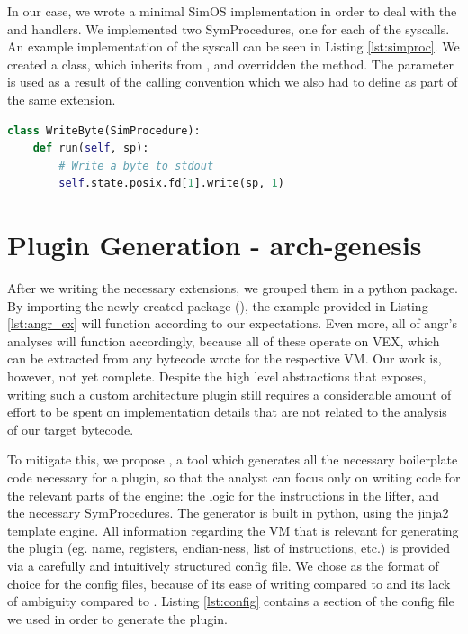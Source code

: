 In our case, we wrote a minimal SimOS implementation in order to deal with the  and  handlers. We implemented two SymProcedures, one for each of the \glspl{syscall}. An example implementation of the  \gls{syscall} can be seen in Listing \ref{lst:simproc}. We created a class, which inherits from , and overridden the  method. The parameter  is used as a result of the calling convention which we also had to define as part of the same extension.

\begin{lstlisting}[language=python, label={lst:simproc}, caption={TODO}]
class WriteByte(SimProcedure):
    def run(self, sp):
        # Write a byte to stdout
        self.state.posix.fd[1].write(sp, 1) 
\end{lstlisting}

\section{Plugin Generation - arch-genesis}

After we writing the necessary extensions, we grouped them in a python package. By importing the newly created package (), the example provided in Listing \ref{lst:angr_ex} will function according to our expectations. Even more, all of angr's analyses will function accordingly, because all of these operate on VEX, which can be extracted from any bytecode wrote for the respective \gls{VM}. Our work is, however, not yet complete. Despite the high level abstractions that  exposes, writing such a custom architecture plugin still requires a considerable amount of effort to be spent on implementation details that are not related to the analysis of our target bytecode.

To mitigate this, we propose , a tool which generates all the necessary boilerplate code necessary for a plugin, so that the analyst can focus only on writing code for the relevant parts of the engine: the logic for the instructions in the lifter, and the necessary SymProcedures. The generator is built in python, using the jinja2 \cite{jinja} template engine. All information regarding the \gls{VM} that is relevant for generating the plugin (eg. name, registers, endian-ness, list of instructions, etc.) is provided via a carefully and intuitively structured config file. We chose  \cite{toml} as the format of choice for the config files, because of its ease of writing compared to  and its lack of ambiguity compared to . Listing \ref{lst:config} contains a section of the config file we used in order to generate the  plugin.

